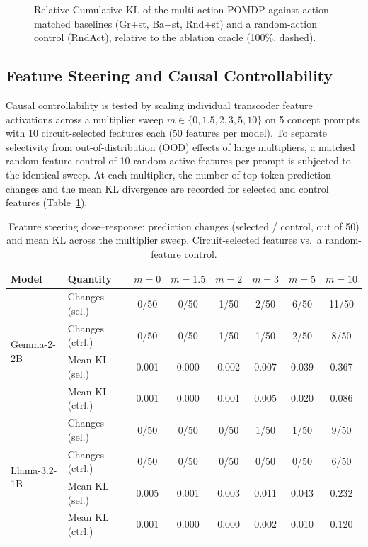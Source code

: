 \begin{figure}[H]
\centering

\caption{Relative Cumulative KL of the multi-action POMDP against
action-matched baselines (Gr+st, Ba+st, Rnd+st) and a random-action
control (RndAct), relative to the ablation oracle (100\%, dashed).}
\label{fig:rck}
\end{figure}

\subsection{Feature Steering and Causal Controllability}

Causal controllability is tested by scaling individual transcoder
feature activations across a multiplier sweep
$m \in \{0, 1.5, 2, 3, 5, 10\}$ on 5 concept prompts with 10
circuit-selected features each (50 features per model).  To separate
selectivity from out-of-distribution (OOD) effects of large
multipliers, a matched random-feature control of 10 random
active features per prompt is subjected to the identical sweep.  At
each multiplier, the number of top-token prediction changes
and the mean KL divergence are recorded for selected and control features
(Table~\ref{tab:steering}).

\begin{table}[H]
\centering
\caption{Feature steering dose--response: prediction changes
(selected / control, out of 50) and mean KL across the multiplier
sweep.  Circuit-selected features vs.\ a random-feature control.}
\label{tab:steering}
{\small
\begin{tabular}{llcccccc}
\toprule
\textbf{Model} & \textbf{Quantity} & \textbf{$m{=}0$} & \textbf{$m{=}1.5$} & \textbf{$m{=}2$} & \textbf{$m{=}3$} & \textbf{$m{=}5$} & \textbf{$m{=}10$} \\
\midrule
\multirow{4}{*}{Gemma-2-2B}
 & Changes (sel.)   & 0/50 & 0/50 & 1/50 & 2/50 & 6/50 & 11/50 \\
 & Changes (ctrl.)  & 0/50 & 0/50 & 1/50 & 1/50 & 2/50 & 8/50 \\
 & Mean KL (sel.)   & 0.001 & 0.000 & 0.002 & 0.007 & 0.039 & 0.367 \\
 & Mean KL (ctrl.)  & 0.001 & 0.000 & 0.001 & 0.005 & 0.020 & 0.086 \\
\midrule
\multirow{4}{*}{Llama-3.2-1B}
 & Changes (sel.)   & 0/50 & 0/50 & 0/50 & 1/50 & 1/50 & 9/50 \\
 & Changes (ctrl.)  & 0/50 & 0/50 & 0/50 & 0/50 & 0/50 & 6/50 \\
 & Mean KL (sel.)   & 0.005 & 0.001 & 0.003 & 0.011 & 0.043 & 0.232 \\
 & Mean KL (ctrl.)  & 0.001 & 0.000 & 0.000 & 0.002 & 0.010 & 0.120 \\
\bottomrule
\end{tabular}%
}
\end{table}

